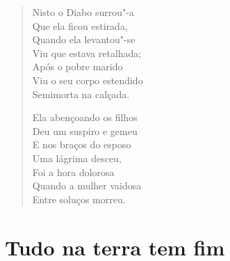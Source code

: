 \begin{verse}
Nisto o Diabo surrou"-a \\
Que ela ficou estirada, \\
Quando ela levantou"-se \\
Viu que estava retalhada; \\
Após o pobre marido \\
Viu o seu corpo estendido \\
Semimorta na calçada. 
\pagebreak

Ela abençoando os filhos \\
Deu um suspiro e gemeu \\
E nos braços do esposo \\
Uma lágrima desceu, \\
Foi a hora dolorosa \\
Quando a mulher vaidosa \\
Entre soluços morreu. 
\end{verse}

\chapter{Tudo na terra tem fim}

